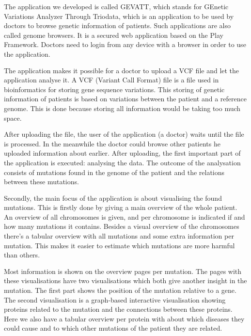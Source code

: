 The application we developed is called GEVATT, which stands for GEnetic Variations Analyzer Through Triodata, which is an application to be used by doctors to browse genetic information of patients. Such applications are also called genome browsers. It is a secured web application based on the Play Framework. Doctors need to login from any device with a browser in order to use the application.

The application makes it possible for a doctor to upload a VCF file and let the application analyse it. A VCF (Variant Call Format) file is a file used in bioinformatics for storing gene sequence variations. This storing of genetic information of patients is based on variations between the patient and a reference genome. This is done because storing all information would be taking too much space.

After uploading the file, the user of the application (a doctor) waits until the file is processed. In the meanwhile the doctor could browse other patients he uploaded information about earlier. After uploading, the first important part of the application is executed: analysing the data. The outcome of the analysation consists of mutations found in the genome of the patient and the relations between these mutations.

Secondly, the main focus of the application is about visualising the found mutations. This is firstly done by giving a main overview of the whole patient. An overview of all chromosomes is given, and per chromosome is indicated if and how many mutations it contains. Besides a visual overview of the chromosomes there's a tabular overview with all mutations and some extra information per mutation. This makes it easier to estimate which mutations are more harmful than others.

Most information is shown on the overview pages per mutation. The pages with these visualisations have two visualisations which both give another insight in the mutation. The first part shows the position of the mutation relative to a gene. The second visualisation is a graph-based interactive visualisation showing proteins related to the mutation and the connections between these proteins. Here we also have a tabular overview per protein with about which diseases they could cause and to which other mutations of the patient they are related.